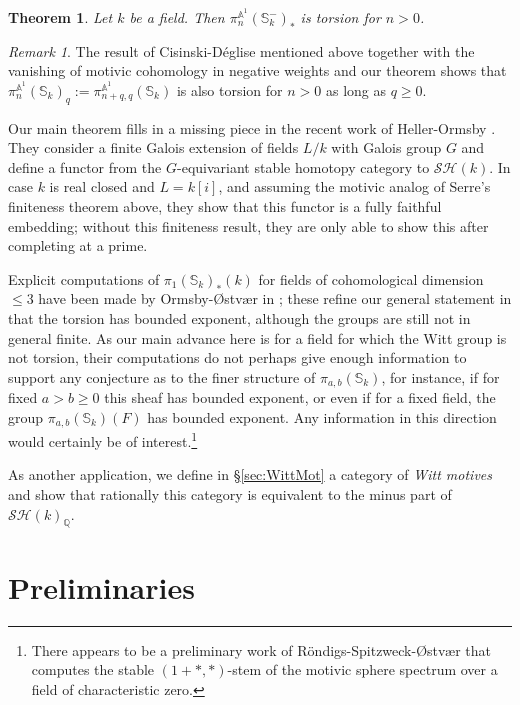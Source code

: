 \documentclass[a4paper,12pt,draft]{amsart}
\newtheorem*{thmIntr}{Theorem}
\theoremstyle{definition}
\theoremstyle{remark}
\newtheorem*{remIntr}{Remark}
\begin{document}
\begin{thmIntr} Let $k$ be a field. Then $\pi^{{{\mathbb A}}^1}_n(\mathbb{S}_k^-)_*$ is torsion for $n>0$. 
\end{thmIntr}

\begin{remIntr} The result of Cisinski-D\'eglise mentioned above together with the vanishing of motivic cohomology in negative weights and our theorem shows that $\pi^{{{\mathbb A}}^1}_n(\mathbb{S}_k)_q:=\pi^{{{\mathbb A}}^1}_{n+q,q}(\mathbb{S}_k)$ is also torsion for $n>0$ as long as $q\ge 0$. 
\end{remIntr}

Our main theorem fills in a missing piece in the recent work of Heller-Ormsby \cite{HO}. They consider a finite Galois extension of fields $L/k$ with Galois group $G$ and define a functor from the $G$-equivariant stable homotopy category to ${\mathcal{SH}}(k)$. In case $k$ is real closed and $L=k[i]$, and  assuming the motivic analog of Serre's finiteness theorem above, they show that this functor is a fully faithful embedding; without this finiteness result, they are only able to show this after completing at a prime. 

Explicit computations of $\pi_1({{\mathbb S}}_k)_*(k)$ for fields of cohomological dimension $\le 3$ have been made by Ormsby-{\O}stv{\ae}r in \cite{OO}; these refine our general statement in that the torsion has bounded exponent, although the groups are still not in general finite. As our main advance here is for a field for which the Witt group is not torsion, their computations do not perhaps give enough information to support any conjecture as to the finer structure of $\pi_{a,b}({{\mathbb S}}_k)$, for instance, if for fixed $a>b\ge0$ this sheaf has bounded exponent, or even if for a fixed field, the group  $\pi_{a,b}({{\mathbb S}}_k)(F)$ has bounded exponent. Any information in this direction would certainly be of interest.\footnote{There appears to be a preliminary work of R\"ondigs-Spitzweck-{\O}stv{\ae}r that computes the stable $(1+*,*)$-stem of the motivic sphere spectrum over a field of characteristic zero.}

As another application, we define in \S\ref{sec:WittMot} a category of {\em Witt motives} and show that rationally this category is equivalent to the minus part of ${\mathcal{SH}}(k)_{{\mathbb Q}}$. 

\section{Preliminaries}
\end{document}

